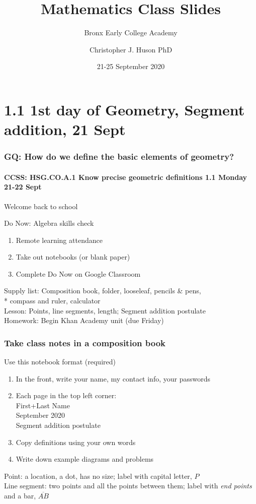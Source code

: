 \documentclass{beamer}
\title{Mathematics Class Slides}
\subtitle{Bronx Early College Academy}
\author{Christopher J. Huson PhD}
\date{21-25 September 2020}
\begin{document}
\frame{\titlepage}
\section[Outline]{}
\frame{\tableofcontents}

\section{1.1 1st day of Geometry, Segment addition, 21 Sept}
\frame
{
  \frametitle{GQ: How do we define the basic elements of geometry?}
  \framesubtitle{CCSS: HSG.CO.A.1 Know precise geometric definitions \hfill \alert{1.1 Monday 21-22 Sept}}

  Welcome back to school
  \begin{block}{Do Now: Algebra skills check}
  \begin{enumerate}
      \item Remote learning attendance
      \item Take out notebooks (or blank paper)
      \item Complete Do Now on Google Classroom
  \end{enumerate}
  \end{block}
  Supply list: Composition book, folder, looseleaf, pencils \& pens, \\*
  compass and ruler, calculator \\
  Lesson: Points, line segments, length; Segment addition postulate \\
  Homework: Begin Khan Academy unit (due Friday)
}

  \frame
  {
    \frametitle{Take class notes in a composition book}
    \begin{block}{Use this notebook format (required)}
      \begin{enumerate}
        \item In the front, write your name, my contact info, your passwords
        \item Each page in the top left corner: \\ \qquad First+Last Name \\
         September 2020 \\  Segment addition postulate \vspace{0.25cm}
        \item Copy definitions using your own words
        \item Write down example diagrams and problems
      \end{enumerate}
      \end{block}
    Point: a location, a dot, has no size; label with capital letter, $P$ \\[0.25cm]
    Line segment: two points and all the points between them; label with \emph{end points} and a bar, $\overline{AB}$ \\
  }
\end{document}
